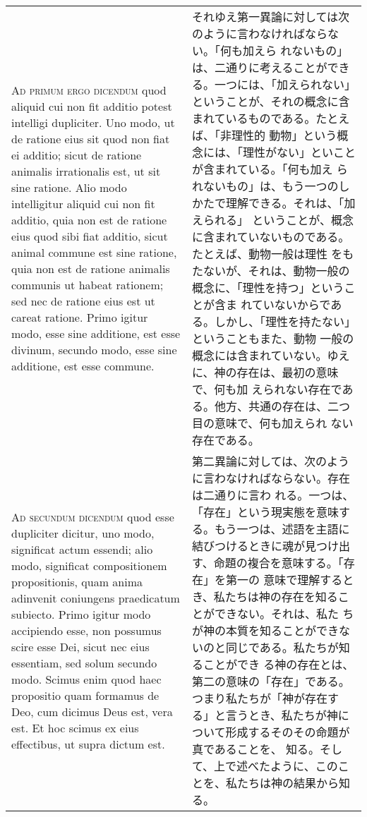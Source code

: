 \documentclass[10pt]{jsarticle}
\begin{document}
\begin{longtable}{p{21em}p{21em}}
\\



\textsc{Ad primum ergo dicendum} quod aliquid cui non fit additio
potest intelligi dupliciter.  Uno modo, ut de ratione eius sit quod
non fiat ei additio; sicut de ratione animalis irrationalis est, ut
sit sine ratione.  Alio modo intelligitur aliquid cui non fit additio,
quia non est de ratione eius quod sibi fiat additio, sicut animal
commune est sine ratione, quia non est de ratione animalis communis ut
habeat rationem; sed nec de ratione eius est ut careat ratione.  Primo
igitur modo, esse sine additione, est esse divinum, secundo modo, esse
sine additione, est esse commune.

&

それゆえ第一異論に対しては次のように言わなければならない。「何も加えら
れないもの」は、二通りに考えることができる。一つには、「加えられない」
ということが、それの概念に含まれているものである。たとえば、「非理性的
動物」という概念には、「理性がない」といことが含まれている。「何も加え
られないもの」は、もう一つのしかたで理解できる。それは、「加えられる」
ということが、概念に含まれていないものである。たとえば、動物一般は理性
をもたないが、それは、動物一般の概念に、「理性を持つ」ということが含ま
れていないからである。しかし、「理性を持たない」ということもまた、動物
一般の概念には含まれていない。ゆえに、神の存在は、最初の意味で、何も加
えられない存在である。他方、共通の存在は、二つ目の意味で、何も加えられ
ない存在である。


\\

\textsc{Ad secundum dicendum} quod esse dupliciter dicitur, uno modo,
significat actum essendi; alio modo, significat compositionem
propositionis, quam anima adinvenit coniungens praedicatum subiecto.
Primo igitur modo accipiendo esse, non possumus scire esse Dei, sicut
nec eius essentiam, sed solum secundo modo. Scimus enim quod haec
propositio quam formamus de Deo, cum dicimus Deus est, vera est. Et
hoc scimus ex eius effectibus, ut supra dictum est.


&

第二異論に対しては、次のように言わなければならない。存在は二通りに言わ
れる。一つは、「存在」という現実態を意味する。もう一つは、述語を主語に
結びつけるときに魂が見つけ出す、命題の複合を意味する。「存在」を第一の
意味で理解するとき、私たちは神の存在を知ることができない。それは、私た
ちが神の本質を知ることができないのと同じである。私たちが知ることができ
る神の存在とは、第二の意味の「存在」である。つまり私たちが「神が存在す
る」と言うとき、私たちが神について形成するそのその命題が真であることを、
知る。そして、上で述べたように、このことを、私たちは神の結果から知る。


\end{longtable}
\end{document}
